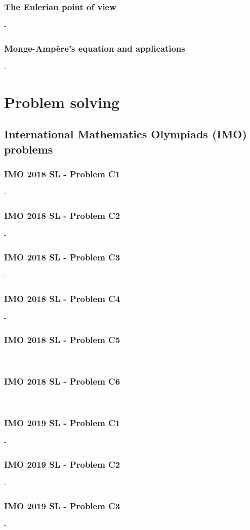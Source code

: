 \documentclass[12pt,openany,oneside]{book}
\theoremstyle{definition}
\numberwithin{definition}{section}
\numberwithin{theorem}{section}
\numberwithin{corollary}{section}
\numberwithin{proposition}{section}
\numberwithin{notation}{section}
\numberwithin{remark}{section}
\numberwithin{hypothesis}{section}
\numberwithin{example}{section}
\begin{document}
\section{The Eulerian point of view}-
\section{Monge-Ampère's equation and applications}-

\part{Problem solving}

\chapter{International Mathematics Olympiads (IMO) problems}

\section{IMO 2018 SL - Problem C1}-
\section{IMO 2018 SL - Problem C2}-
\section{IMO 2018 SL - Problem C3}-
\section{IMO 2018 SL - Problem C4}-
\section{IMO 2018 SL - Problem C5}-
\section{IMO 2018 SL - Problem C6}-

\section{IMO 2019 SL - Problem C1}-
\section{IMO 2019 SL - Problem C2}-
\section{IMO 2019 SL - Problem C3}-
\end{document}

